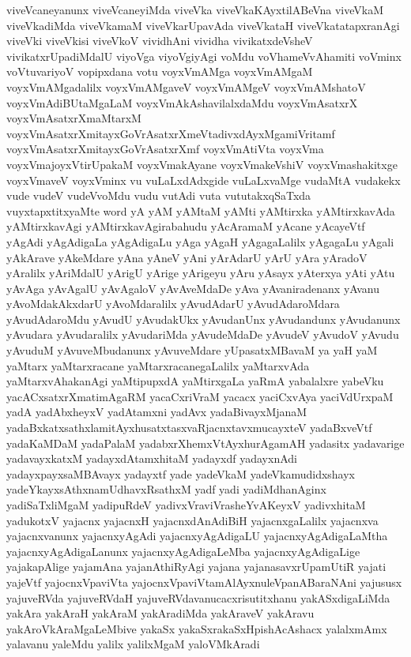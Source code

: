 {viveVcaneyanunx
viveVcaneyiMda
viveVka
viveVkaKAyxtilABeVna
viveVkaM
viveVkadiMda
viveVkamaM
viveVkarUpavAda
viveVkataH
viveVkatatapxranAgi
viveVki
viveVkisi
viveVkoV
vividhAni
vividha
vivikatxdeVsheV
vivikatxrUpadiMdalU
viyoVga
viyoVgiyAgi
voMdu
voVhameVvAhamiti
voVminx
voVtuvariyoV
vopipxdana
votu
voyxVmAMga
voyxVmAMgaM
voyxVmAMgadalilx
voyxVmAMgaveV
voyxVmAMgeV
voyxVmAMshatoV
voyxVmAdiBUtaMgaLaM
voyxVmAkAshavilalxdaMdu
voyxVmAsatxrX
voyxVmAsatxrXmaMtarxM
voyxVmAsatxrXmitayxGoVrAsatxrXmeVtadivxdAyxMgamiVritamf
voyxVmAsatxrXmitayxGoVrAsatxrXmf
voyxVmAtiVta
voyxVma
voyxVmajoyxVtirUpakaM
voyxVmakAyane
voyxVmakeVshiV
voyxVmashakitxge
voyxVmaveV
voyxVminx
vu
vuLaLxdAdxgide
vuLaLxvaMge
vudaMtA
vudakekx
vude
vudeV
vudeVvoMdu
vudu
vutAdi
vuta
vututakxqSaTxda
vuyxtapxtitxyaMte
word
yA
yAM
yAMtaM
yAMti
yAMtirxka
yAMtirxkavAda
yAMtirxkavAgi
yAMtirxkavAgirabahudu
yAcAramaM
yAcane
yAcayeVtf
yAgAdi
yAgAdigaLa
yAgAdigaLu
yAga
yAgaH
yAgagaLalilx
yAgagaLu
yAgali
yAkArave
yAkeMdare
yAna
yAneV
yAni
yArAdarU
yArU
yAra
yAradoV
yAralilx
yAriMdalU
yArigU
yArige
yArigeyu
yAru
yAsayx
yAterxya
yAti
yAtu
yAvAga
yAvAgalU
yAvAgaloV
yAvAveMdaDe
yAva
yAvaniradenanx
yAvanu
yAvoMdakAkxdarU
yAvoMdaralilx
yAvudAdarU
yAvudAdaroMdara
yAvudAdaroMdu
yAvudU
yAvudakUkx
yAvudanUnx
yAvudandunx
yAvudanunx
yAvudara
yAvudaralilx
yAvudariMda
yAvudeMdaDe
yAvudeV
yAvudoV
yAvudu
yAvuduM
yAvuveMbudanunx
yAvuveMdare
yUpasatxMBavaM
ya
yaH
yaM
yaMtarx
yaMtarxracane
yaMtarxracanegaLalilx
yaMtarxvAda
yaMtarxvAhakanAgi
yaMtipupxdA
yaMtirxgaLa
yaRmA
yabalalxre
yabeVku
yacACxsatxrXmatimAgaRM
yacaCxriVraM
yacacx
yaciCxvAya
yaciVdUrxpaM
yadA
yadAbxheyxV
yadAtamxni
yadAvx
yadaBivayxMjanaM
yadaBxkatxsathxlamitAyxhusatxtasxvaRjacnxtavxmucayxteV
yadaBxveVtf
yadaKaMDaM
yadaPalaM
yadabxrXhemxVtAyxhurAgamAH
yadasitx
yadavarige
yadavayxkatxM
yadayxdAtamxhitaM
yadayxdf
yadayxnAdi
yadayxpayxsaMBAvayx
yadayxtf
yade
yadeVkaM
yadeVkamudidxshayx
yadeYkayxsAthxnamUdhavxRsathxM
yadf
yadi
yadiMdhanAginx
yadiSaTxliMgaM
yadipuRdeV
yadivxVraviVrasheYvAKeyxV
yadivxhitaM
yadukotxV
yajacnx
yajacnxH
yajacnxdAnAdiBiH
yajacnxgaLalilx
yajacnxva
yajacnxvanunx
yajacnxyAgAdi
yajacnxyAgAdigaLU
yajacnxyAgAdigaLaMtha
yajacnxyAgAdigaLanunx
yajacnxyAgAdigaLeMba
yajacnxyAgAdigaLige
yajakapAlige
yajamAna
yajanAthiRyAgi
yajana
yajanasavxrUpamUtiR
yajati
yajeVtf
yajocnxVpaviVta
yajocnxVpaviVtamAlAyxnuleVpanABaraNAni
yajususx
yajuveRVda
yajuveRVdaH
yajuveRVdavanucacxrisutitxhanu
yakASxdigaLiMda
yakAra
yakAraH
yakAraM
yakAradiMda
yakAraveV
yakAravu
yakAroVkAraMgaLeMbive
yakaSx
yakaSxrakaSxHpishAcAshacx
yalalxmAmx
yalavanu
yaleMdu
yalilx
yalilxMgaM
yaloVMkAradi
}

